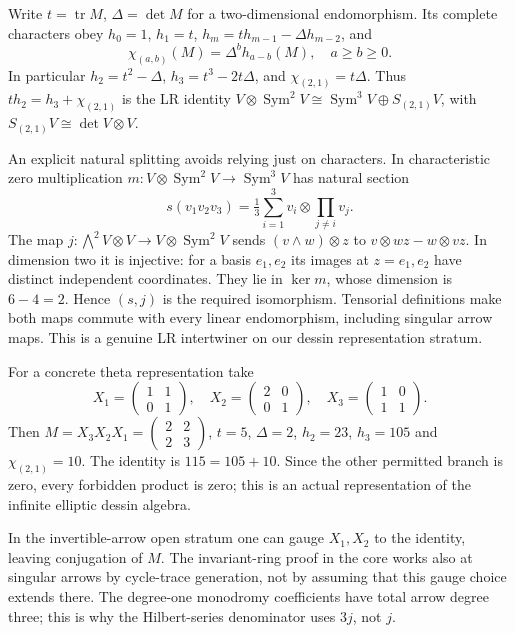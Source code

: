 \documentclass[11pt,oneside,openany]{book}
\theoremstyle{definition}\newtheorem{definition}[theorem]{Definition}
\theoremstyle{remark}\newtheorem{remark}[theorem]{Remark}
\DeclareMathOperator{\tr}{tr}\DeclareMathOperator{\Rea}{Re}
\begin{document}
Write $t=\tr M$, $\Delta=\det M$ for a two-dimensional endomorphism. Its complete characters obey $h_0=1$, $h_1=t$, $h_m=th_{m-1}-\Delta h_{m-2}$, and
\[
 \chi_{(a,b)}(M)=\Delta^b h_{a-b}(M),\quad a\ge b\ge0.
\]
In particular $h_2=t^2-\Delta$, $h_3=t^3-2t\Delta$, and $\chi_{(2,1)}=t\Delta$. Thus $t h_2=h_3+\chi_{(2,1)}$ is the LR identity $V\otimes\operatorname{Sym}^2V\cong\operatorname{Sym}^3V\oplus S_{(2,1)}V$, with $S_{(2,1)}V\cong\det V\otimes V$.

An explicit natural splitting avoids relying just on characters. In characteristic zero multiplication $m:V\otimes\operatorname{Sym}^2V\to\operatorname{Sym}^3V$ has natural section
\[
 s(v_1v_2v_3)=\tfrac13\sum_{i=1}^3v_i\otimes\prod_{j\ne i}v_j.
\]
The map $j:\bigwedge^2V\otimes V\to V\otimes\operatorname{Sym}^2V$ sends $(v\wedge w)\otimes z$ to $v\otimes wz-w\otimes vz$. In dimension two it is injective: for a basis $e_1,e_2$ its images at $z=e_1,e_2$ have distinct independent coordinates. They lie in $\ker m$, whose dimension is $6-4=2$. Hence $(s,j)$ is the required isomorphism. Tensorial definitions make both maps commute with every linear endomorphism, including singular arrow maps. This is a genuine LR intertwiner on our dessin representation stratum.

For a concrete theta representation take
\[
 X_1=\begin{pmatrix}1&1\\0&1\end{pmatrix},\quad
 X_2=\begin{pmatrix}2&0\\0&1\end{pmatrix},\quad
 X_3=\begin{pmatrix}1&0\\1&1\end{pmatrix}.
\]
Then $M=X_3X_2X_1=\left(\begin{smallmatrix}2&2\\2&3\end{smallmatrix}\right)$, $t=5$, $\Delta=2$, $h_2=23$, $h_3=105$ and $\chi_{(2,1)}=10$. The identity is $115=105+10$. Since the other permitted branch is zero, every forbidden product is zero; this is an actual representation of the infinite elliptic dessin algebra.

In the invertible-arrow open stratum one can gauge $X_1,X_2$ to the identity, leaving conjugation of $M$. The invariant-ring proof in the core works also at singular arrows by cycle-trace generation, not by assuming that this gauge choice extends there. The degree-one monodromy coefficients have total arrow degree three; this is why the Hilbert-series denominator uses $3j$, not $j$.
\end{document}
